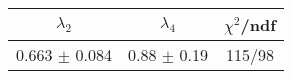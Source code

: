 \begin{tabular}{c|c||c}
$\lambda_{2}$ & $\lambda_4$ & $\chi^{2}$/ndf \\
\hline
0.663 $\pm$ 0.084 & 0.88 $\pm$ 0.19 & 115/98\\
\end{tabular}
